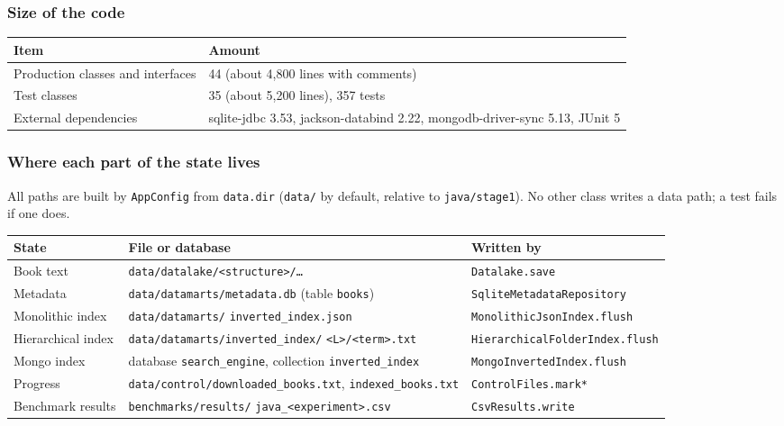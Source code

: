 \documentclass[11pt,a4paper]{article}
\newcommand{\code}[1]{\texttt{#1}}
\begin{document}
\subsubsection{Size of the code}
\begin{table}[H]
\centering\small
\begin{tabularx}{\linewidth}{@{}l Y@{}}
\toprule
Item & Amount \\
\midrule
Production classes and interfaces & 44 (about 4,800 lines with comments) \\
Test classes & 35 (about 5,200 lines), 357 tests \\
External dependencies & sqlite-jdbc 3.53, jackson-databind 2.22, mongodb-driver-sync 5.13, JUnit 5 \\
\bottomrule
\end{tabularx}
\end{table}

\subsubsection{Where each part of the state lives}
All paths are built by \code{AppConfig} from \code{data.dir} (\code{data/} by default, relative to
\code{java/stage1}). No other class writes a data path; a test fails if one does.

\begin{table}[H]
\centering\small
\begin{tabularx}{\linewidth}{@{}p{2.3cm} Y p{5.4cm}@{}}
\toprule
State & File or database & Written by \\
\midrule
Book text & \code{data/datalake/<structure>/\ldots} & \code{Datalake.save} \\
Metadata & \code{data/datamarts/metadata.db} (table \code{books}) & \code{SqliteMetadataRepository} \\
Monolithic index & \code{data/datamarts/} \code{inverted\_index.json} & \code{MonolithicJsonIndex.flush} \\
Hierarchical index & \code{data/datamarts/inverted\_index/} \code{<L>/<term>.txt} & \code{HierarchicalFolderIndex.flush} \\
Mongo index & database \code{search\_engine}, collection \code{inverted\_index} & \code{MongoInvertedIndex.flush} \\
Progress & \code{data/control/downloaded\_books.txt}, \code{indexed\_books.txt} & \code{ControlFiles.mark*} \\
Benchmark results & \code{benchmarks/results/} \code{java\_<experiment>.csv} & \code{CsvResults.write} \\
\bottomrule
\end{tabularx}
\end{table}
\end{document}

